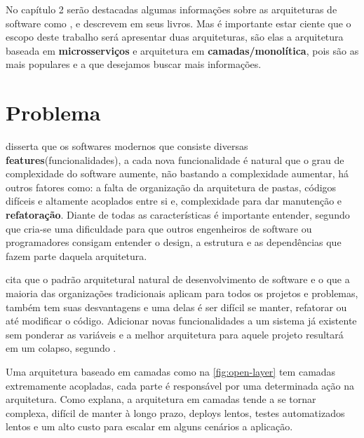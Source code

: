  
 No capítulo 2 serão destacadas algumas informações sobre as arquiteturas de software como \cite{Tanenbaum1944}, \cite{Richards2015} e \cite{Chiaradia2018} descrevem em seus livros. Mas é importante estar ciente que o escopo deste trabalho será apresentar duas arquiteturas, são elas a arquitetura baseada em \textbf{microsserviços} e arquitetura em \textbf{camadas/monolítica}, pois são as mais populares e a que desejamos buscar mais informações.

\section{Problema}

 disserta que os softwares modernos que consiste diversas \textbf{features}(funcionalidades), a cada nova funcionalidade é natural que o grau de complexidade do software aumente, não bastando a complexidade aumentar, há outros fatores como: a falta de organização da arquitetura de pastas, códigos difíceis e altamente acoplados entre si e, complexidade para dar manutenção e \textbf{refatoração}. Diante de todas as características é importante entender, segundo \cite{Schmidt2018} que cria-se uma dificuldade para que outros engenheiros de software ou programadores consigam entender o design, a estrutura e as dependências que fazem parte daquela arquitetura.

\cite{Richards2015} cita que o padrão arquitetural natural de desenvolvimento de software e o que a maioria das organizações tradicionais aplicam para todos os projetos e problemas, também tem suas desvantagens e uma delas é ser difícil se manter, refatorar ou até modificar o código. Adicionar novas funcionalidades a um sistema já existente sem ponderar as variáveis e a melhor arquitetura para aquele projeto resultará em um colapso, segundo \cite{Schmidt2018}.

Uma arquitetura baseado em camadas como na \ref{fig:open-layer} tem camadas extremamente acopladas, cada parte é responsável por uma determinada ação na arquitetura. Como \cite{Richards2015} explana, a arquitetura em camadas tende a se tornar complexa, difícil de manter à longo prazo, deploys lentos, testes automatizados lentos e um alto custo para escalar em alguns cenários a aplicação.

